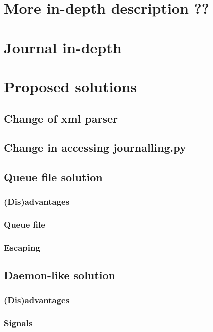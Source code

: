 \section{More in-depth description ?? }

\section{Journal in-depth}

\section{Proposed solutions}

\subsection{Change of xml parser}

\subsection{Change in accessing journalling.py}

\subsection{Queue file solution}

\subsubsection{(Dis)advantages}

\subsubsection{Queue file}

\subsubsection{Escaping}


\subsection{Daemon-like solution}

\subsubsection{(Dis)advantages}

\subsubsection{Signals}


